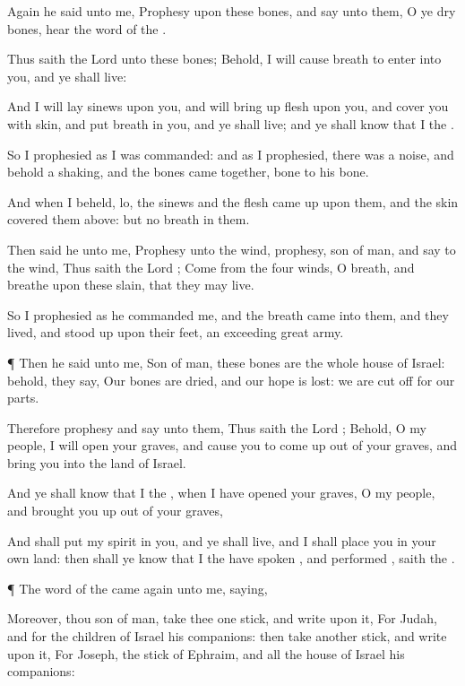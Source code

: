 {Again he
said unto me,
Prophesy upon these
bones, and
say unto them, O ye
dry
bones,
hear the
word of the
{}.

Thus
saith the
Lord
{} unto these
bones; Behold, I will cause
breath to
enter into you, and ye shall
live:

And I will
lay
sinews upon you, and will bring
up
flesh upon you, and
cover you with
skin, and
put
breath in you, and ye shall
live; and ye shall
know that I
{} the
{}.

So I
prophesied as I was
commanded: and as I
prophesied, there was a
noise, and behold a
shaking, and the
bones came
together,
bone to his
bone.

And when I
beheld, lo, the
sinews and the
flesh came
up upon them, and the
skin
covered them
above: but
{} no
breath in them.

Then
said he unto me,
Prophesy unto the
wind,
prophesy,
son of
man, and
say to the
wind, Thus
saith the
Lord
{};
Come from the
four
winds, O
breath, and
breathe upon these
slain, that they may
live.

So I
prophesied as he
commanded me, and the
breath
came into them, and they
lived, and stood
up upon their
feet, an
exceeding
great
army.


\par }{\PP {}¶ Then he
said unto me,
Son of
man, these
bones are the whole
house of
Israel: behold, they
say, Our
bones are
dried, and our
hope is
lost: we are cut
off for our parts.

Therefore
prophesy and
say unto them, Thus
saith the
Lord
{}; Behold, O my
people, I will
open your
graves, and cause you to come
up out of your
graves, and
bring you into the
land of
Israel.

And ye shall
know that I
{} the
{}, when I have
opened your
graves, O my
people, and brought you
up out of your
graves,

And shall
put my
spirit in you, and ye shall
live, and I shall
place you in your own
land: then shall ye
know that I the
{} have
spoken
{}, and
performed
{},
saith the
{}.


\par }{\PP {}¶ The
word of the
{} came again unto me,
saying,

Moreover, thou
son of
man,
take thee
one
stick, and
write upon it, For
Judah, and for the
children of
Israel his
companions: then
take
another
stick, and
write upon it, For
Joseph, the
stick of
Ephraim, and
{} all the
house of
Israel his
companions:

}
